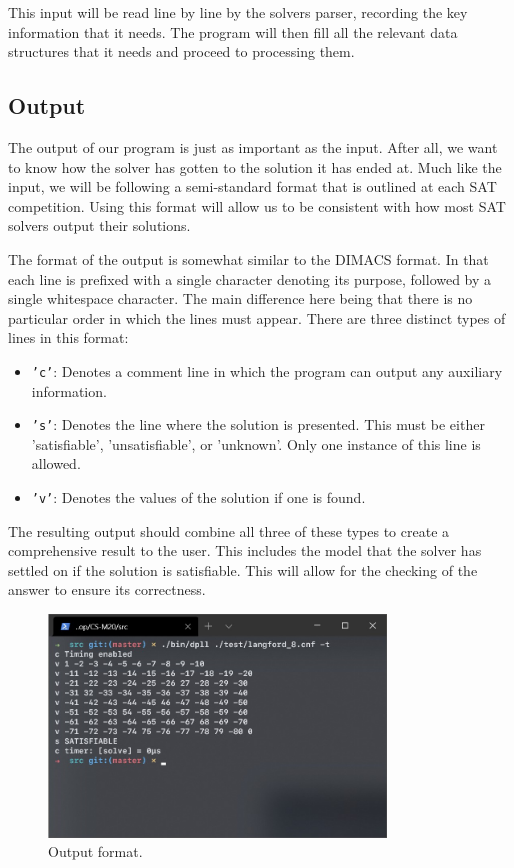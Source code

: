 \documentclass{article}
\begin{document}
This input will be read line by line by the solvers parser, recording the key information that it
needs. The program will then fill all the relevant data structures that it needs and proceed to processing them.

\subsection{Output}
The output of our program is just as important as the input. After all, we want to know how the
solver has gotten to the solution it has ended at. Much like the input, we will be following a
semi-standard format that is outlined at each SAT competition. Using this format will allow us to be
consistent with how most SAT solvers output their solutions.

The format of the output is somewhat similar to the DIMACS format. In that each line is prefixed
with a single character denoting its purpose, followed by a single whitespace character. The main
difference here being that there is no particular order in which the lines must appear. There are
three distinct types of lines in this format:

\begin{itemize}
    \item \texttt{'c'}: Denotes a comment line in which the program can output any auxiliary
          information.
    \item \texttt{'s'}: Denotes the line where the solution is presented. This must be either
          'satisfiable', 'unsatisfiable', or 'unknown'. Only one instance of this line is allowed.
    \item \texttt{'v'}: Denotes the values of the solution if one is found.
\end{itemize}

The resulting output should combine all three of these types to create a comprehensive result to the
user. This includes the model that the solver has settled on if the solution is satisfiable. This
will allow for the checking of the answer to ensure its correctness.

\begin{figure}[h]
    \centering
    \includegraphics[width=0.8\textwidth]{output_example.jpg}
    \caption{Output format.}
\end{figure}
\end{document}
